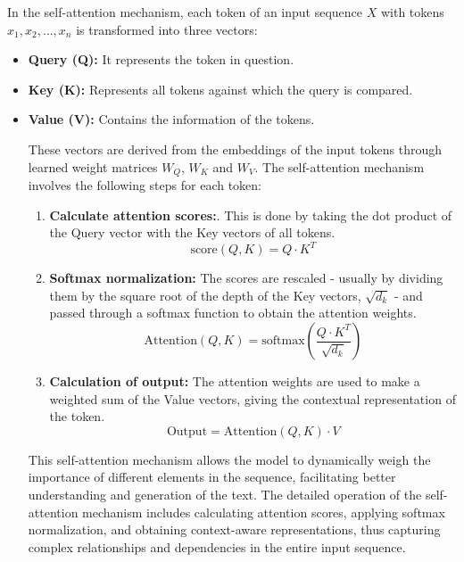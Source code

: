 In the self-attention mechanism, each token of an input sequence \( X \) with tokens \( x_1, x_2, \ldots, x_n \) is transformed into three vectors:
\begin{itemize}
    \item \textbf{Query (Q):} It represents the token in question.
    \item \textbf{Key (K):} Represents all tokens against which the query is compared.
    \item \textbf{Value (V):} Contains the information of the tokens.

These vectors are derived from the embeddings of the input tokens through learned weight matrices \( W_Q \), \( W_K \) and \( W_V \). The self-attention mechanism involves the following steps for each token:

\begin{enumerate}
    \item \textbf{Calculate attention scores:}. This is done by taking the dot product of the Query vector with the Key vectors of all tokens.
    \begin{equation}
        \text{score}(Q, K) = Q \cdot K^T
    \end{equation}
    
    \item \textbf{Softmax normalization:} The scores are rescaled - usually by dividing them by the square root of the depth of the Key vectors, \( \sqrt{d_k} \) - and passed through a softmax function to obtain the attention weights.
    \begin{equation}
        \text{Attention}(Q, K) = \text{softmax}\left(\frac{Q \cdot K^T}{\sqrt{d_k}} \right)
    \end{equation}
    
    \item \textbf{Calculation of output:} The attention weights are used to make a weighted sum of the Value vectors, giving the contextual representation of the token.
    \begin{equation}
        \text{Output} = \text{Attention}(Q, K) \cdot V
    \end{equation}
\end{enumerate}

This self-attention mechanism allows the model to dynamically weigh the importance of different elements in the sequence, facilitating better understanding and generation of the text. The detailed operation of the self-attention mechanism includes calculating attention scores, applying softmax normalization, and obtaining context-aware representations, thus capturing complex relationships and dependencies in the entire input sequence. \cite{geeksforgeeks2024-sa}


\end{itemize}
